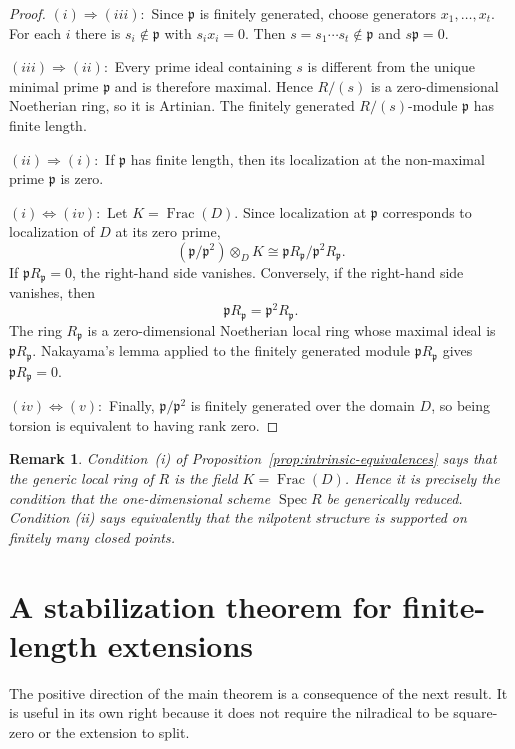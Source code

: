 \documentclass[11pt]{article}
\newtheorem{remark}[theorem]{Remark}
\theoremstyle{definition}
\newcommand{\Spec}{\operatorname{Spec}}
\newcommand{\Frac}{\operatorname{Frac}}
\begin{document}
\begin{proof}
$(i)\Rightarrow (iii):$  Since $\mathfrak p$ is finitely generated, choose generators
$x_1,\ldots,x_t$.  For each $i$ there is $s_i\notin\mathfrak p$ with $s_ix_i=0$.
Then $s=s_1\cdots s_t\notin\mathfrak p$ and $s\mathfrak p=0$.

$(iii)\Rightarrow (ii):$  Every prime ideal containing $s$ is different from the unique minimal prime
$\mathfrak p$ and is therefore maximal.  Hence $R/(s)$ is a zero-dimensional Noetherian ring,
so it is Artinian.  The finitely generated $R/(s)$-module $\mathfrak p$ has finite length. 

$(ii)\Rightarrow (i):$ If $\mathfrak p$ has finite length, then its localization at the non-maximal prime
$\mathfrak p$ is zero. 

$(i)\Leftrightarrow (iv):$  Let $K=\Frac(D)$.  Since localization at
$\mathfrak p$ corresponds to localization of $D$ at its zero prime,
\[
 (\mathfrak p/\mathfrak p^2)\otimes_DK
 \cong
 \mathfrak pR_{\mathfrak p}/\mathfrak p^2R_{\mathfrak p}.
\]
If $\mathfrak pR_{\mathfrak p}=0$, the right-hand side vanishes.  Conversely, if the
right-hand side vanishes, then
\[
 \mathfrak pR_{\mathfrak p}=\mathfrak p^2R_{\mathfrak p}.
\]
The ring $R_{\mathfrak p}$ is a zero-dimensional Noetherian local ring whose maximal ideal is
$\mathfrak pR_{\mathfrak p}$.  Nakayama's lemma applied to the finitely generated module
$\mathfrak pR_{\mathfrak p}$ gives $\mathfrak pR_{\mathfrak p}=0$. 

$(iv)\Leftrightarrow (v):$ Finally, $\mathfrak p/\mathfrak p^2$ is finitely generated over the domain $D$, so
being torsion is equivalent to having rank zero. 
\end{proof}

\begin{remark}\label{rem:geometry}
Condition~(i) of Proposition~\ref{prop:intrinsic-equivalences} says that the generic local ring of $R$ is the
field $K=\Frac(D)$.  Hence it is precisely the condition that the one-dimensional scheme
$\Spec R$ be generically reduced.  Condition (ii) says equivalently that the nilpotent
structure is supported on finitely many closed points.
\end{remark}

\section{A stabilization theorem for finite-length extensions}

The positive direction of the main theorem is a consequence of the next result.  It is useful in
its own right because it does not require the nilradical to be square-zero or the extension to
split.
\end{document}
